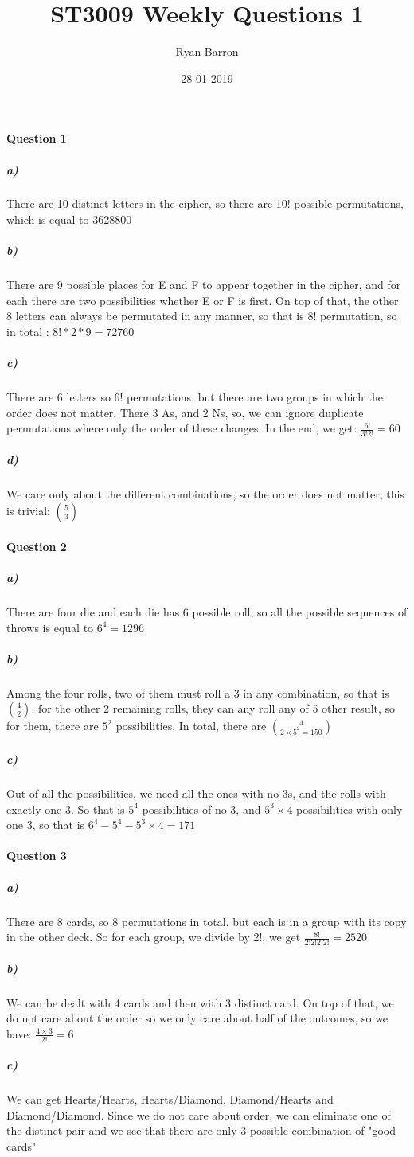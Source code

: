 \documentclass{article}
\title{ST3009 Weekly Questions 1}
\date{28-01-2019}
\author{Ryan Barron}
\begin{document}
\maketitle

\paragraph{Question 1}
\subparagraph{a)}   
There are 10 distinct letters in the cipher, so there are 10! possible permutations, which is equal to 3628800
\subparagraph{b)}
There are 9 possible places for E and F to appear together in the cipher, and for each there are two possibilities whether E or F is first. On top of that, the other 8 letters can always be permutated in any manner, so that is 8! permutation, so in total : $8!*2*9 = 72760$ 
\subparagraph{c)}
There are 6 letters so 6! permutations, but there are two groups in which the order does not matter. There 3 As, and 2 Ns, so, we can ignore duplicate permutations where only the order of these changes. In the end, we get: $\frac{6!}{3!2!}=60$ 
\subparagraph{d)}
We care only about the different combinations, so the order does not matter, this is trivial: $5 \choose 3$ 

\paragraph{Question 2}
\subparagraph{a)}
There are four die and each die has 6 possible roll, so all the possible sequences of throws is equal to $6^4 = 1296$
\subparagraph{b)}
Among the four rolls, two of them must roll a 3 in any combination, so that is $4 \choose 2$, for the other 2 remaining rolls, they can any roll any of 5 other result, so for them, there are $5^2$ possibilities. In total, there are $4 \choose 2 \times 5^2 = 150$ 
\subparagraph{c)}
Out of all the possibilities, we need all the ones with no 3s, and the rolls with exactly one 3. So that is $5^4$ possibilities of no 3, and $5^3 \times 4$ possibilities with only one 3, so that is $6^4 - 5^4 - 5^3 \times 4 = 171$
\pagebreak
\paragraph{Question 3}
\subparagraph{a)}
There are 8 cards, so 8 permutations in total, but each is in a group with its copy in the other deck. So for each group, we divide by 2!, we get $\frac{8!}{2!2!2!2!} = 2520$
\subparagraph{b)}
We can be dealt with 4 cards and then with 3 distinct card. On top of that, we do not care about the order so we only care about half of the outcomes, so we have: $\frac{4\times3}{2!} = 6$
\subparagraph{c)}
We can get Hearts/Hearts, Hearts/Diamond, Diamond/Hearts and Diamond/Diamond. Since we do not care about order, we can eliminate one of the distinct pair and we see that there are only 3 possible combination of "good cards"
\end{document}

